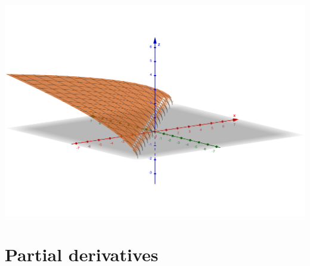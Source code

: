 \begin{example}
\begin{itemize}
\begin{center}
            \includegraphics[scale=0.1]{images/11-ex4-c.png}
        \end{center}
    \end{itemize}
\end{example}


\section{Partial derivatives}

